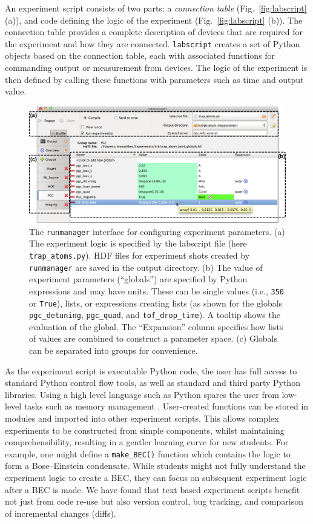 An experiment script consists of two parts: a \textit{connection table} (Fig.~\ref{fig:labscript} (a)), and code defining the logic of the experiment (Fig.~\ref{fig:labscript} (b)).
The connection table provides a complete description of devices that are required for the experiment and how they are connected.
\texttt{labscript} creates a set of Python objects based on the connection table, each with associated functions for commanding output or measurement from devices.
The logic of the experiment is then defined by calling these functions with parameters such as time and output value.

\begin{figure}%
\includegraphics{figures/software/runmanager.eps}%
\caption{The \texttt{runmanager} interface for configuring experiment parameters.
(a) The experiment logic is specified by the labscript file (here \texttt{trap\_atoms.py}).
HDF files for experiment shots created by \texttt{runmanager} are saved in the output directory.
(b) The value of experiment parameters (``globals'') are specified by Python expressions and may have units.
These can be single values (i.e., \texttt{350} or \texttt{True}), lists, or expressions creating lists (as shown for the globals \texttt{pgc\_detuning}, \texttt{pgc\_quad}, and \texttt{tof\_drop\_time}).
A tooltip shows the evaluation of the global.
The ``Expansion'' column specifies how lists of values are combined to construct a parameter space.
(c) Globals can be separated into groups for convenience.
}%
\label{fig:runmanager}%
\end{figure}

As the experiment script is executable Python code, the user has full access to standard Python control flow tools, as well as standard and third party Python libraries.
Using a high level language such as Python spares the user from low-level tasks such as memory management \cite{varoquaux_agile_2008}.
User-created functions can be stored in modules and imported into other experiment scripts.
This allows complex experiments to be constructed from simple components, whilst maintaining comprehensibility, resulting in a gentler learning curve for new students.
For example, one might define a \texttt{make\_BEC()} function which contains the logic to form a Bose--Einstein condensate.
While students might not fully understand the experiment logic to create a BEC, they can focus on subsequent experiment logic after a BEC is made.
We have found that text based experiment scripts benefit not just from code re-use but also version control, bug tracking, and comparison of incremental changes (diffs).

